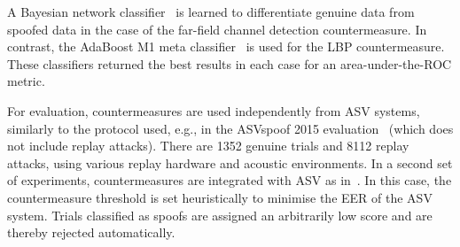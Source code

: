 A Bayesian network classifier~\cite{Pearl1988} is learned to differentiate genuine data from spoofed data in the case of the far-field channel detection countermeasure.  In contrast, the AdaBoost M1 meta classifier~\cite{Freund1999}  is used for the LBP countermeasure.  These classifiers returned the best results in each case for an area-under-the-ROC metric.  %



For evaluation, countermeasures are used independently from ASV systems, similarly to the protocol used, e.g., in the ASVspoof 2015 evaluation~\cite{Wu2015} (which does not include replay attacks).  There are 1352 genuine trials and 8112 replay attacks, using various replay hardware and acoustic environments.  
In a second set of experiments, countermeasures are integrated with ASV as in~\cite{Alegre2013a}. In this case, the countermeasure threshold is set heuristically to minimise the EER of the ASV system. Trials classified as spoofs are assigned an arbitrarily low score and are thereby rejected automatically.
